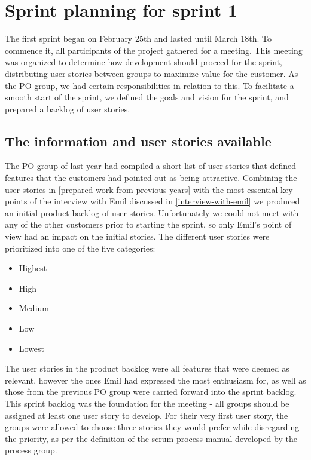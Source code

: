 \section{Sprint planning for sprint 1}\label{sprint-1-planning}
The first sprint began on February 25th and lasted until March 18th.
To commence it, all participants of the project gathered for a meeting.
This meeting was organized to determine how development should proceed for the sprint, distributing user stories between groups to maximize value for the customer.
As the PO group, we had certain responsibilities in relation to this.
To facilitate a smooth start of the sprint, we defined the goals and vision for the sprint, and prepared a backlog of user stories.

\subsection{The information and user stories available}
The PO group of last year had compiled a short list of user stories that defined features that the customers had pointed out as being attractive.
Combining the user stories in \autoref{prepared-work-from-previous-years} with the most essential key points of the interview with Emil discussed in \autoref{interview-with-emil} we produced an initial product backlog of user stories.
Unfortunately we could not meet with any of the other customers prior to starting the sprint, so only Emil's point of view had an impact on the initial stories.
The different user stories were prioritized into one of the five categories:
\begin{itemize}
    \item Highest
    \item High
    \item Medium
    \item Low
    \item Lowest
\end{itemize}
\noindent
The user stories in the product backlog were all features that were deemed as relevant, however the ones Emil had expressed the most enthusiasm for, as well as those from the previous PO group were carried forward into the sprint backlog.
This sprint backlog was the foundation for the meeting - all groups should be assigned at least one user story to develop.
For their very first user story, the groups were allowed to choose three stories they would prefer while disregarding the priority, as per the definition of the scrum process manual developed by the process group.

